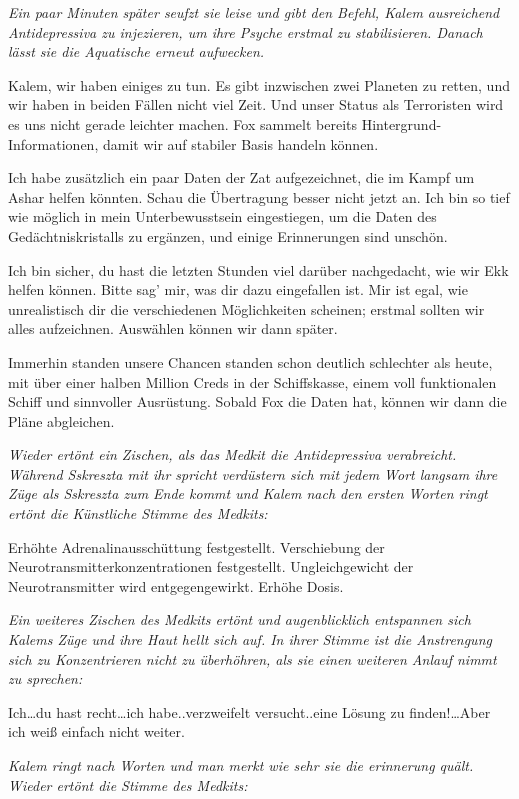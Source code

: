 \documentclass[11pt]{article}
\begin{document}
\emph{Ein paar Minuten später seufzt sie leise und gibt den Befehl,
Kalem ausreichend Antidepressiva zu injezieren, um ihre Psyche erstmal
zu stabilisieren. Danach lässt sie die Aquatische erneut aufwecken.}

Kalem, wir haben einiges zu tun. Es gibt inzwischen zwei Planeten zu
retten, und wir haben in beiden Fällen nicht viel Zeit. Und unser Status
als Terroristen wird es uns nicht gerade leichter machen. Fox sammelt
bereits Hintergrund-Informationen, damit wir auf stabiler Basis handeln
können.

Ich habe zusätzlich ein paar Daten der Zat aufgezeichnet, die im Kampf
um Ashar helfen könnten. Schau die Übertragung besser nicht jetzt an.
Ich bin so tief wie möglich in mein Unterbewusstsein eingestiegen, um
die Daten des Gedächtniskristalls zu ergänzen, und einige Erinnerungen
sind unschön.

Ich bin sicher, du hast die letzten Stunden viel darüber nachgedacht,
wie wir Ekk helfen können. Bitte sag' mir, was dir dazu eingefallen ist.
Mir ist egal, wie unrealistisch dir die verschiedenen Möglichkeiten
scheinen; erstmal sollten wir alles aufzeichnen. Auswählen können wir
dann später.

Immerhin standen unsere Chancen standen schon deutlich schlechter als
heute, mit über einer halben Million Creds in der Schiffskasse, einem
voll funktionalen Schiff und sinnvoller Ausrüstung. Sobald Fox die Daten
hat, können wir dann die Pläne abgleichen.

\emph{Wieder ertönt ein Zischen, als das Medkit die Antidepressiva
verabreicht. Während Sskreszta mit ihr spricht verdüstern sich mit jedem
Wort langsam ihre Züge als Sskreszta zum Ende kommt und Kalem nach den
ersten Worten ringt ertönt die Künstliche Stimme des Medkits:}

Erhöhte Adrenalinausschüttung festgestellt. Verschiebung der
Neurotransmitterkonzentrationen festgestellt. Ungleichgewicht der
Neurotransmitter wird entgegengewirkt. Erhöhe Dosis.

\emph{Ein weiteres Zischen des Medkits ertönt und augenblicklich
entspannen sich Kalems Züge und ihre Haut hellt sich auf. In ihrer
Stimme ist die Anstrengung sich zu Konzentrieren nicht zu überhöhren,
als sie einen weiteren Anlauf nimmt zu sprechen:}

Ich\ldots{}du hast recht\ldots{}ich habe..verzweifelt versucht..eine
Lösung zu finden!\ldots{}Aber ich weiß einfach nicht weiter.

\emph{Kalem ringt nach Worten und man merkt wie sehr sie die erinnerung
quält. Wieder ertönt die Stimme des Medkits:}
\end{document}
